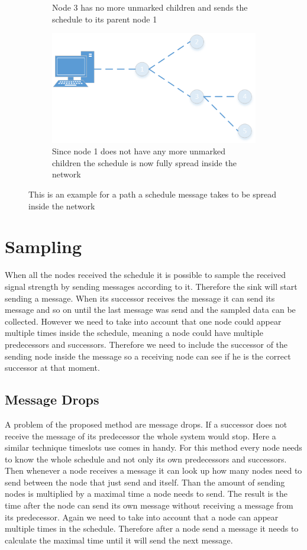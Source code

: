 \begin{figure}[htbp]
\begin{subfigure}[t]{0.4\textwidth}
   	 	\caption{Node 3 has no more unmarked children and sends the schedule to its parent node 1}
    	\label{fig:density}
    \end{subfigure}
    \quad
    \quad	
    \begin{subfigure}[t]{0.4\textwidth}
		\centering         
        \includegraphics[scale=0.6]{content/images/ScheduleSpreading/Part10}
        \caption{Since node 1 does not have any more unmarked children the schedule is now fully spread inside the network}
        \label{fig:link}
    \end{subfigure}
    \caption{This is an example for a path a schedule message takes to be spread inside the network}
\end{figure}

\section{Sampling}
When all the nodes received the schedule it is possible to sample the received signal strength by sending messages according to it. Therefore the sink will start sending a message. When its successor receives the message it can send its message and so on until the last message was send and the sampled data can be collected. However we need to take into account that one node could appear multiple times inside the schedule, meaning a node could have multiple predecessors and successors. Therefore we need to include the successor of the sending node inside the message so a receiving node can see if he is the correct successor at that moment. 
\subsection{Message Drops}
A problem of the proposed method are message drops. If a successor does not receive the message of its predecessor the whole system would stop. Here a similar technique timeslots use comes in handy. For this method every node needs to know the whole schedule and not only its own predecessors and successors. Then whenever a node receives a message it can look up how many nodes need to send between the node that just send and itself. Than the amount of sending nodes is multiplied by a maximal time a node needs to send. The result is the time after the node can send its own message without receiving a message from its predecessor. Again we need to take into account that a node can appear multiple times in the schedule. Therefore after a node send a message it needs to calculate the maximal time until it will send the next message.
